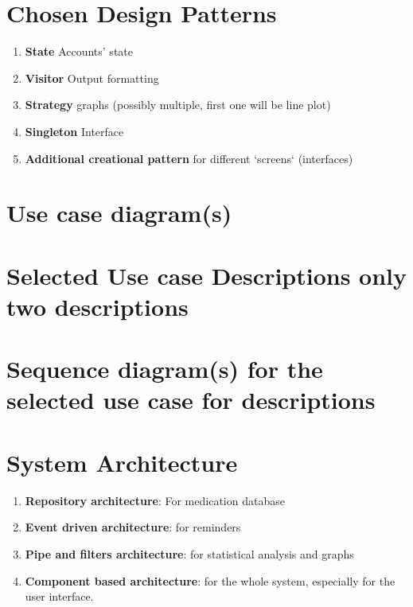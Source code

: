 \documentclass[11pt]{article}
\begin{document}
    \section{Chosen Design Patterns}\label{sec:chosen-design-patterns}

    \begin{enumerate}
        \item \textbf{State} Accounts' state\cite{RefactoringGuru}
        \item \textbf{Visitor} Output formatting\cite{RefactoringGuru}
        \item \textbf{Strategy} graphs (possibly multiple, first one will be line plot)\cite{RefactoringGuru} %
        \item \textbf{Singleton} Interface\cite{RefactoringGuru}
        \item \textbf{Additional creational pattern} for different `screens` (interfaces)\cite{RefactoringGuru}
    \end{enumerate}


    \section{Use case diagram(s)}\label{sec:use-case-diagram(s)}


    \section{Selected Use case Descriptions {only two descriptions}}\label{sec:selected-use-case-descriptions}


    \section{Sequence diagram(s) {for the selected use case for descriptions}}\label{sec:sequence-diagram(s)}


    \section{System Architecture}\label{sec:system-architecture}

    \begin{enumerate}
        \item \textbf{Repository architecture}: For medication database
        \item \textbf{Event driven architecture}: for reminders
        \item \textbf{Pipe and filters architecture}: for statistical analysis and graphs
        \item \textbf{Component based architecture}: for the whole system, especially for the user interface.
    \end{enumerate}
\end{document}
